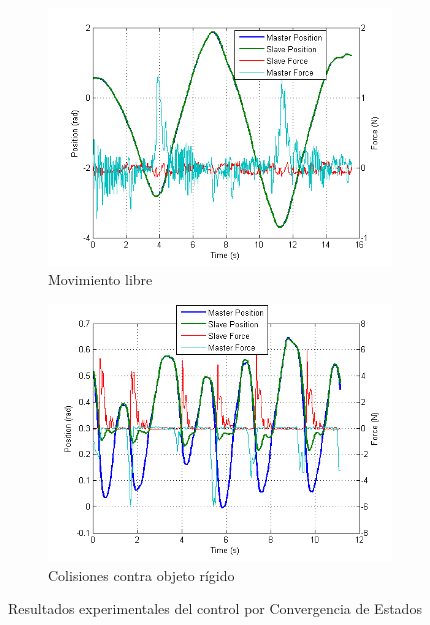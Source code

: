 \begin{figure}[htbp]
\centering
	\begin{subfigure}[h]
		\centering
		\includegraphics[width=\textwidth]{converge-exp-libre}
		\caption{Movimiento libre}
		\label{fig:converge-exp-libre}
	\end{subfigure}
	\begin{subfigure}[h]
		\centering
		\includegraphics[width=\textwidth]{converge-exp-env}
		\caption{Colisiones contra objeto rígido}
		\label{fig:converge-exp-env}
	\end{subfigure}		
	\caption{Resultados experimentales del control por Convergencia de Estados}
  	\label{fig:converge-exp}
\end{figure}

